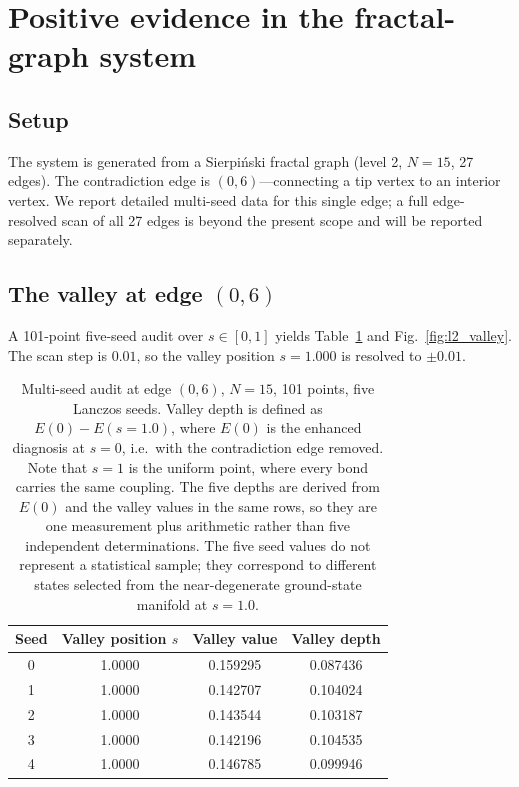 \documentclass[aps,prb,reprint,superscriptaddress]{revtex4-2}
\begin{document}
\section{Positive evidence in the fractal-graph system}

\subsection{Setup}

The system is generated from a Sierpi\'{n}ski fractal graph (level 2, $N=15$, 27 edges). The contradiction edge is $(0,6)$---connecting a tip vertex to an interior vertex. We report detailed multi-seed data for this single edge; a full edge-resolved scan of all 27 edges is beyond the present scope and will be reported separately.

\subsection{The valley at edge $(0,6)$}

A 101-point five-seed audit over $s\in[0,1]$ yields Table~\ref{tab:l2_valley} and Fig.~\ref{fig:l2_valley}. The scan step is $0.01$, so the valley position $s=1.000$ is resolved to $\pm0.01$.

\begin{table}[t]
\centering
\caption{Multi-seed audit at edge $(0,6)$, $N=15$, 101 points, five Lanczos seeds. Valley depth is defined as $E(0)-E(s=1.0)$, where $E(0)$ is the enhanced diagnosis at $s=0$, i.e.\ with the contradiction edge removed. Note that $s=1$ is the uniform point, where every bond carries the same coupling. The five depths are derived from $E(0)$ and the valley values in the same rows, so they are one measurement plus arithmetic rather than five independent determinations. The five seed values do not represent a statistical sample; they correspond to different states selected from the near-degenerate ground-state manifold at $s=1.0$.}
\label{tab:l2_valley}
\begin{tabular}{cccc}
\toprule
Seed & Valley position $s$ & Valley value & Valley depth \\
\midrule
0 & 1.0000 & 0.159295 & 0.087436 \\
1 & 1.0000 & 0.142707 & 0.104024 \\
2 & 1.0000 & 0.143544 & 0.103187 \\
3 & 1.0000 & 0.142196 & 0.104535 \\
4 & 1.0000 & 0.146785 & 0.099946 \\
\bottomrule
\end{tabular}
\end{table}
\end{document}
